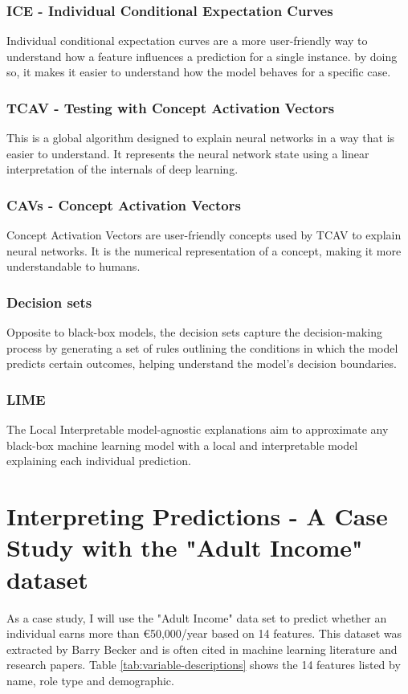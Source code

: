 \documentclass[10pt,journal,compsoc]{IEEEtran}
\begin{document}
\subsubsection{ICE - Individual Conditional Expectation Curves}
Individual conditional expectation curves are a more user-friendly way to understand how a feature influences a prediction for a single instance. by doing so, it makes it easier to understand how the model behaves for a specific case.

\subsubsection{TCAV - Testing with Concept Activation Vectors}
This is a global algorithm designed to explain neural networks in a way that is easier to understand. It represents the neural network state using a linear interpretation of the internals of deep learning.

\subsubsection{CAVs - Concept Activation Vectors}
Concept Activation Vectors are user-friendly concepts used by TCAV to explain neural networks. It is the numerical representation of a concept, making it more understandable to humans.

\subsubsection{Decision sets}
Opposite to black-box models, the decision sets capture the decision-making process by generating a set of rules outlining the conditions in which the model predicts certain outcomes, helping understand the model's decision boundaries.

\subsubsection{LIME }
The Local Interpretable model-agnostic explanations aim to approximate any black-box machine learning model with a local and interpretable model explaining each individual prediction.

\section{Interpreting Predictions - A Case Study with the "Adult Income" dataset}
As a case study, I will use the "Adult Income" data set\cite{misc_adult_2} to predict whether an individual earns more than €50,000/year based on 14 features. This dataset was extracted by Barry Becker and is often cited in machine learning literature and research papers. 
Table \ref{tab:variable-descriptions} shows the 14 features listed by name, role type and demographic.
\end{document}

